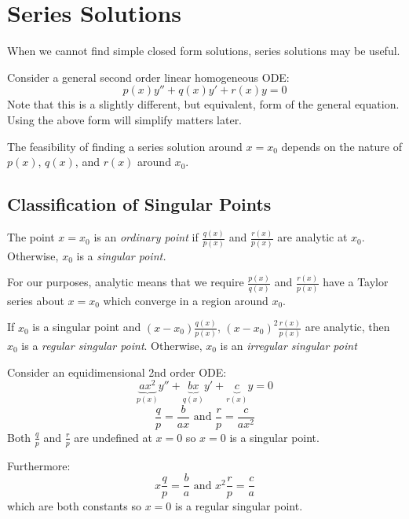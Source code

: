 \documentclass[../main.tex]{subfiles}
\begin{document}
\section{Series Solutions}
When we cannot find simple closed form solutions, series solutions may be useful.

Consider a general second order linear homogeneous ODE:
\[
  p(x)y'' + q(x)y' + r(x)y = 0
\]
Note that this is a slightly different, but equivalent, form of the general equation.
Using the above form will simplify matters later.

The feasibility of finding a series solution around $x = x_0$ depends on the nature of $p(x)$, $q(x)$, and $r(x)$ around $x_0$.
\subsection{Classification of Singular Points}
\begin{definition}
  The point $x = x_0$ is an \textit{ordinary point} if $\frac{q(x)}{p(x)}$ and $\frac{r(x)}{p(x)}$ are analytic at $x_0$.
  Otherwise, $x_0$ is a \textit{singular point.}
\end{definition}
\begin{remark}[Note]
  For our purposes, analytic means that we require $\frac{p(x)}{q(x)}$ and $\frac{r(x)}{p(x)}$ have a Taylor series about $x = x_0$ which converge in a region around $x_0$.
\end{remark}
\begin{definition}
  If $x_0$ is a singular point and $(x - x_0)\frac{q(x)}{p(x)}$, $(x - x_0)^2\frac{r(x)}{p(x)}$ are analytic, then $x_0$ is a \textit{regular singular point}.
  Otherwise, $x_0$ is an \textit{irregular singular point}
\end{definition}
\begin{example}
  Consider an equidimensional 2nd order ODE:
  \[
    \underbrace{ax^2}_{p(x)} y'' + \underbrace{bx}_{q(x)}y' + \underbrace{c}_{r(x)}y = 0
  \]
  \[
    \frac{q}{p} = \frac{b}{ax} \text{ and } \frac{r}{p} = \frac{c}{ax^2}
  \]
  Both $\frac{q}{p}$ and $\frac{r}{p}$ are undefined at $x = 0$ so $x = 0$ is a singular point.

  Furthermore:
  \[
    x \frac{q}{p} = \frac{b}{a} \text{ and } x^2\frac{r}{p} = \frac{c}{a}
  \]
  which are both constants so $x = 0$ is a regular singular point.
\end{example}
\end{document}
